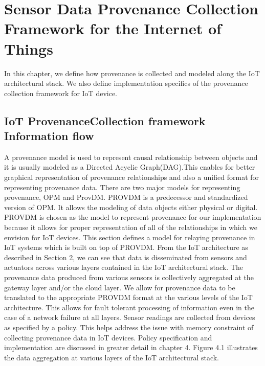 
\chapter{Sensor Data Provenance Collection Framework for the Internet of Things}

In this chapter, we define how provenance is collected and modeled along the IoT architectural stack. We also define implementation specifics of the provenance collection framework for IoT device. 

\section{IoT Provenance\-Collection framework Information flow}
%

A provenance model is used to represent causal relationship between objects and it is usually modeled as a Directed Acyclic Graph(DAG).This enables for better graphical representation of provenance relationships and also a unified format for representing provenance data. There are two major models for representing provenance, OPM and Prov\-DM. PROV\-DM is a predecessor and standardized version of OPM. It allows the modeling of data objects either physical or digital. PROV\-DM is chosen as the model to represent provenance for our implementation because it allows for proper representation of all of the relationships in which we envision for IoT devices. This section defines a model for relaying provenance in IoT systems which is built on top of PROV\-DM. 
From the IoT architecture as described in Section 2, we can see that data is disseminated from sensors and actuators across various layers contained in the IoT architectural stack. The provenance data produced from various sensors is collectively aggregated at the gateway layer and/or the cloud layer. We allow for provenance data to be translated to the appropriate PROV\-DM format at the various levels of the IoT architecture. This allows for fault tolerant processing of information even in the case of a network failure at all layers. Sensor readings are collected from devices as specified by a policy. This helps address the issue with memory constraint  of collecting provenance data in IoT devices. Policy specification and implementation  are discussed in greater detail in chapter 4.  Figure 4.1 illustrates the data aggregation at various layers of the IoT architectural stack.


